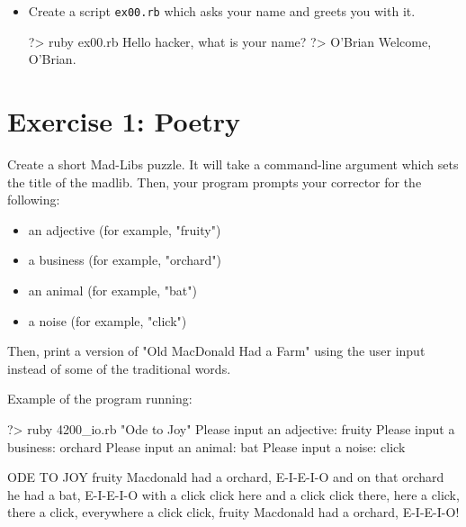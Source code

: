 \documentclass{42-en}
\begin{document}
\begin{itemize}

\item Create a script \texttt{ex00.rb} which asks your name and greets you with it.

\begin{42console}
	?> ruby ex00.rb
	Hello hacker, what is your name?
	?> O'Brian
	Welcome, O'Brian.
\end{42console}

\end{itemize}



\chapter{Exercise 1: Poetry}

\makeheaderfiles

Create a short Mad-Libs puzzle. It will take a command-line argument which sets the title of the madlib. Then, your program prompts your corrector for the following:
\begin{itemize}
\item an adjective (for example, "fruity")
\item a business (for example, "orchard")
\item an animal (for example, "bat")
\item a noise (for example, "click")
\end{itemize}
Then, print a version of "Old MacDonald Had a Farm" using the user input instead of some of the traditional words.

Example of the program running:

\begin{42console}
	?> ruby 4200_io.rb "Ode to Joy"
	Please input an adjective: fruity
	Please input a business: orchard
	Please input an animal: bat
	Please input a noise: click

	ODE TO JOY
	fruity Macdonald had a orchard, E-I-E-I-O
	and on that orchard he had a bat, E-I-E-I-O
	with a click click here
	and a click click there,
	here a click, there a click,
	everywhere a click click,
	fruity Macdonald had a orchard, E-I-E-I-O! 
\end{42console}
\end{document}
